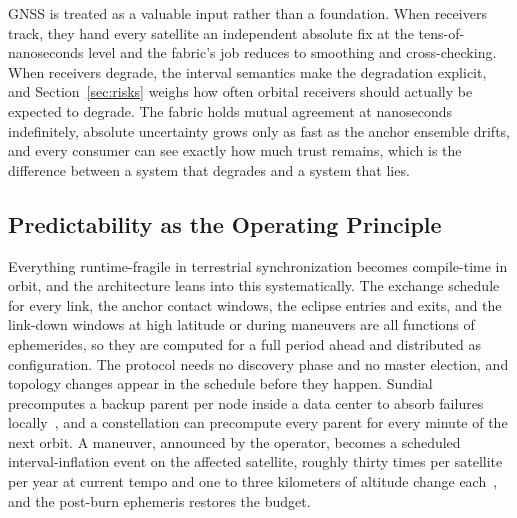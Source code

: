 \documentclass[twocolumn,10pt]{article}
\begin{document}
GNSS is treated as a valuable input rather than a foundation. When receivers track, they hand every satellite an independent absolute fix at the tens-of-nanoseconds level and the fabric's job reduces to smoothing and cross-checking. When receivers degrade, the interval semantics make the degradation explicit, and Section~\ref{sec:risks} weighs how often orbital receivers should actually be expected to degrade. The fabric holds mutual agreement at nanoseconds indefinitely, absolute uncertainty grows only as fast as the anchor ensemble drifts, and every consumer can see exactly how much trust remains, which is the difference between a system that degrades and a system that lies.

\subsection{Predictability as the Operating Principle}\label{sec:predictability}
Everything runtime-fragile in terrestrial synchronization becomes compile-time in orbit, and the architecture leans into this systematically. The exchange schedule for every link, the anchor contact windows, the eclipse entries and exits, and the link-down windows at high latitude or during maneuvers are all functions of ephemerides, so they are computed for a full period ahead and distributed as configuration. The protocol needs no discovery phase and no master election, and topology changes appear in the schedule before they happen. Sundial precomputes a backup parent per node inside a data center to absorb failures locally~\cite{li2020}, and a constellation can precompute every parent for every minute of the next orbit. A maneuver, announced by the operator, becomes a scheduled interval-inflation event on the affected satellite, roughly thirty times per satellite per year at current tempo and one to three kilometers of altitude change each~\cite{pfandzelter2023,maneuvers2025}, and the post-burn ephemeris restores the budget.
\end{document}
